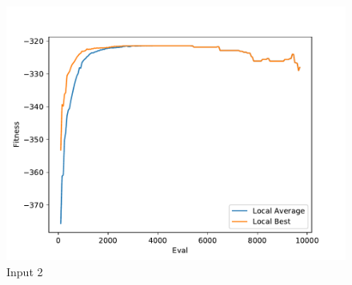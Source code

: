 \documentclass{standalone}
\begin{document}
\begin{figure}[!htb]
	\caption{Input 2}
	\label{fig:graph_2063}
	\includegraphics[width=\textwidth]{../graphs/graphs/2063.pdf}
\end{figure}
\end{document}

